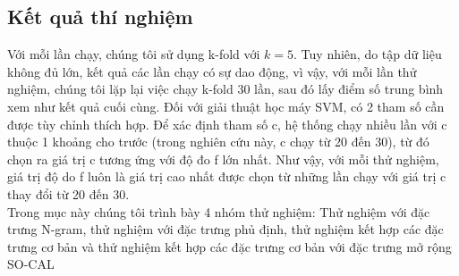 \subsection{Kết quả thí nghiệm} \label{subsec:ket-qua-thi-nghiem}
Với mỗi lần chạy, chúng tôi sử dụng k-fold với $k=5$. Tuy nhiên, do tập dữ liệu không đủ lớn, kết quả các lần chạy có sự dao động, vì vậy, với mỗi lần thử nghiệm, chúng tôi lặp lại việc chạy k-fold 30 lần, sau đó lấy điểm số trung bình xem như kết quả cuối cùng. Đối với giải thuật học máy SVM, có 2 tham số cần được tùy chỉnh thích hợp. Để xác định tham số c, hệ thống chạy nhiều lần với c thuộc 1 khoảng cho trước (trong nghiên cứu này, c chạy từ 20 đến 30), từ đó chọn ra giá trị c tương ứng với độ đo f lớn nhất. Như vậy, với mỗi thử nghiệm, giá trị độ do f luôn là giá trị cao nhất được chọn từ những lần chạy với giá trị c thay đổi từ 20 đến 30. \\

Trong mục này chúng tôi trình bày 4 nhóm thử nghiệm: Thử nghiệm với đặc trưng N-gram, thử nghiệm với đặc trưng phủ định, thử nghiệm kết hợp các đặc trưng cơ bản và thử nghiệm kết hợp các đặc trưng cơ bản với đặc trưng mở rộng SO-CAL
